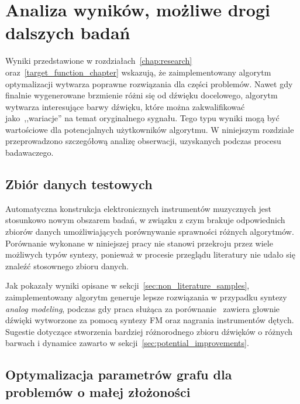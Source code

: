 \chapter{Analiza wyników, możliwe drogi dalszych badań}\label{chap:results_analysis}



Wyniki przedstawione w rozdziałach~\ref{chap:research} oraz~\ref{target_function_chapter}
wskazują, że zaimplementowany algorytm optymalizacji wytwarza poprawne rozwiązania
dla części problemów. Nawet gdy finalnie wygenerowane brzmienie różni
się od dźwięku docelowego, algorytm wytwarza interesujące barwy dźwięku,
które można zakwalifikować jako~,,wariacje'' na temat oryginalnego sygnału.
Tego typu wyniki mogą być wartościowe dla potencjalnych użytkowników algorytmu.
W niniejszym rozdziale przeprowadzono szczegółową analizę obserwacji,
uzyskanych podczas procesu badawaczego.


\section{Zbiór danych testowych}\label{sec:not_enough_benchmarking_data}

Automatyczna konstrukcja elektronicznych instrumentów muzycznych jest stosunkowo
nowym obszarem badań, w związku z czym brakuje odpowiednich zbiorów danych
umożliwiających porównywanie sprawności różnych algorytmów.
Porównanie wykonane w niniejszej pracy nie stanowi przekroju
przez wiele możliwych typów syntezy, ponieważ w procesie przeglądu
literatury nie udało się znaleźć stosownego zbioru danych.

Jak pokazały wyniki opisane w sekcji~\ref{sec:non_literature_samples},
zaimplementowany algorytm generuje lepsze rozwiązania w przypadku
syntezy \textit{analog modeling}, podczas gdy praca służąca
za porównanie~\cite{evolutionary_puredata} zawiera głownie dźwięki wytworzone
za pomocą syntezy FM oraz nagrania instrumentów dętych. Sugestie dotyczące
stworzenia bardziej różnorodnego zbioru dźwięków o różnych barwach
i dynamice zawarto w sekcji~\ref{sec:potential_improvements}.


\section{Optymalizacja parametrów grafu dla problemów o małej złożoności}

